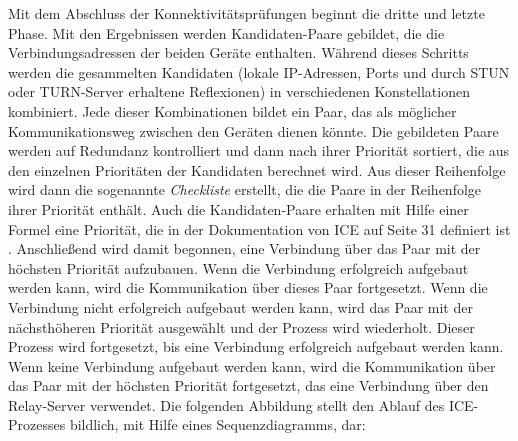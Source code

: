 Mit dem Abschluss der Konnektivitätsprüfungen beginnt die dritte und letzte Phase. Mit den Ergebnissen werden Kandidaten-Paare gebildet, die die Verbindungsadressen der beiden Geräte enthalten. Während dieses Schritts werden die gesammelten Kandidaten (lokale IP-Adressen, Ports und durch STUN oder TURN-Server erhaltene Reflexionen) in verschiedenen Konstellationen kombiniert. Jede dieser Kombinationen bildet ein Paar, das als möglicher Kommunikationsweg zwischen den Geräten dienen könnte. Die gebildeten Paare werden auf Redundanz kontrolliert und dann nach ihrer Priorität sortiert, die aus den einzelnen Prioritäten der Kandidaten berechnet wird. Aus dieser Reihenfolge wird dann die sogenannte \textit{Checkliste} erstellt, die die Paare in der Reihenfolge ihrer Priorität enthält. Auch die Kandidaten-Paare erhalten mit Hilfe einer Formel eine Priorität, die in der Dokumentation von ICE auf Seite 31 definiert ist \parencite[S. 31]{rfc8445_ICE}. Anschließend  wird damit begonnen, eine Verbindung über das Paar mit der höchsten Priorität aufzubauen. Wenn die Verbindung erfolgreich aufgebaut werden kann, wird die Kommunikation über dieses Paar fortgesetzt. Wenn die Verbindung nicht erfolgreich aufgebaut werden kann, wird das Paar mit der nächsthöheren Priorität ausgewählt und der Prozess wird wiederholt. Dieser Prozess wird fortgesetzt, bis eine Verbindung erfolgreich aufgebaut werden kann. Wenn keine Verbindung aufgebaut werden kann, wird die Kommunikation über das Paar mit der höchsten Priorität fortgesetzt, das eine Verbindung über den Relay-Server verwendet. Die folgenden Abbildung stellt den Ablauf des ICE-Prozesses bildlich, mit Hilfe eines Sequenzdiagramms, dar:

